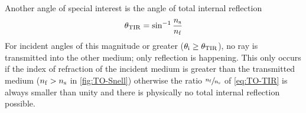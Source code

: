Another angle of special interest is the angle of total internal reflection 
\begin{equation}
  \theta_{\mathrm{TIR}}=\sin^{-1} \frac{n_{\mathrm{s}}}{n_{\mathrm{f}}}
  \label{eq:TO-TIR}
\end{equation}
For incident angles of this magnitude or greater 
($\theta_{\mathrm{i}}\geq\theta_{\mathrm{TIR}}$), no ray is transmitted into the other 
medium; only reflection is happening. This only occurs if the index of 
refraction of the incident medium is greater than the transmitted medium 
($n_{\mathrm{f}}>n_{\mathrm{s}}$ in \cref{fig:TO-Snell}) otherwise the ratio $\sfrac{n_{\mathrm{f}}}{n_{\mathrm{s}}}$ of 
\cref{eq:TO-TIR} is always smaller than unity and there is physically no total 
internal reflection possible.


